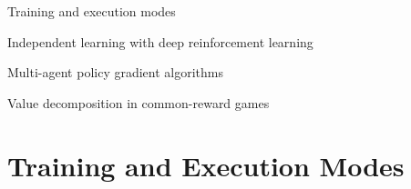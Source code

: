 

\otherslide

\subtitle{Multi-Agent Deep Reinforcement Learning -- Part 1}


\maketitle

\introslide

\begin{frame}{\outline}

\blist
    \item Training and execution modes
    \item Independent learning with deep reinforcement learning
    \item Multi-agent policy gradient algorithms
    \item Value decomposition in common-reward games
\elist
\end{frame}

\section{Training and Execution Modes}


